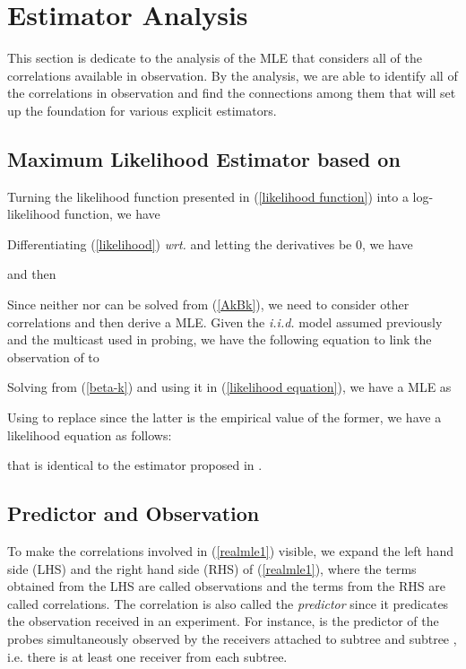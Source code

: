 \documentclass[10pt,onecolumn]{IEEEtran}
\begin{document}
\section{Estimator Analysis} \label{section3}
This section is dedicate to the analysis of the MLE that considers all of the correlations available in observation. By the analysis, we are able to identify all of the correlations in observation and find the connections among them that will set up the foundation for various explicit estimators.

\subsection{Maximum Likelihood Estimator based on } \label{2.a}

Turning the likelihood function presented in (\ref{likelihood function}) into a log-likelihood function, we have
 
 Differentiating (\ref{likelihood}) {\it wrt.} 
and letting the derivatives be 0, we have


and then

Since neither  nor  can be solved from (\ref{AkBk}), we need to consider other correlations and then derive a MLE.
Given the {\it i.i.d.} model assumed previously and the multicast used in probing, we have the following equation to link the observation of  to 

Solving  from (\ref{beta-k}) and using it in (\ref{likelihood equation}), we have a MLE as

Using  to replace  since the latter is the empirical value of the former, we have a likelihood equation as follows:

that is identical to the estimator proposed in \cite{CDHT99}.



\subsection{Predictor and  Observation}



 To make the correlations involved in (\ref{realmle1}) visible,  we expand  the left hand side (LHS) and the right hand side (RHS) of  (\ref{realmle1}), where the terms obtained from the LHS are called observations and the terms from the RHS are called correlations. The correlation is also called  the {\it predictor} since it predicates the observation received in an experiment.  For instance,  is the predictor of the probes simultaneously observed by the receivers attached to subtree  and subtree , i.e. there is at least one receiver from each subtree. 
\end{document}
